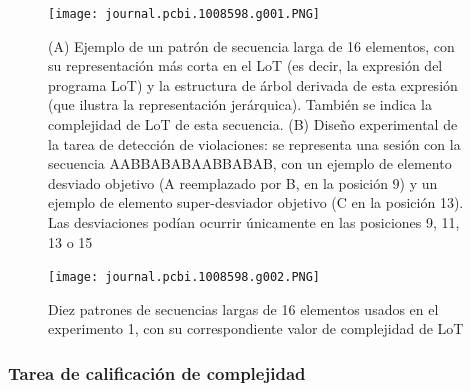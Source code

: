 \begin{figure}[t!]
      \texttt{[image: journal.pcbi.1008598.g001.PNG]}
     
      \centering
     
      \caption{(A) Ejemplo de un patrón de secuencia larga de 16 elementos, con su representación más corta en el LoT (es decir, la expresión del programa LoT) y la estructura de árbol derivada de esta expresión (que ilustra la representación jerárquica). También se indica la complejidad de LoT de esta secuencia. (B) Diseño experimental de la tarea de detección de violaciones: se representa una sesión con la secuencia AABBABABAABBABAB, con un ejemplo de elemento desviado objetivo (A reemplazado por B, en la posición 9) y un ejemplo de elemento super-desviador objetivo (C en la posición 13). Las desviaciones podían ocurrir únicamente en las posiciones 9, 11, 13 o 15}
      \label{PlosBIO-F1}
\end{figure}

\begin{figure}[t!]
      \texttt{[image: journal.pcbi.1008598.g002.PNG]}
      \centering
      \caption{Diez patrones de secuencias largas de 16 elementos usados en el experimento 1, con su correspondiente valor de complejidad de LoT}
      \label{PlosBIO-F2}
\end{figure}

\subsubsection{Tarea de calificación de complejidad}



